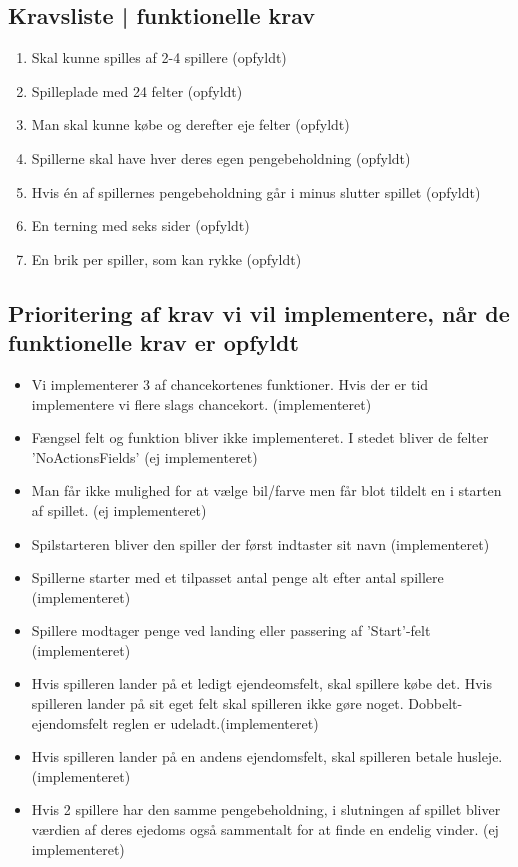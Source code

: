 \documentclass{article}
\begin{document}
\subsection{Kravsliste | funktionelle krav}
\begin{enumerate}
    \item Skal kunne spilles af 2-4 spillere (opfyldt)
    \item Spilleplade med 24 felter (opfyldt)
    \item Man skal kunne købe og derefter eje felter (opfyldt)
    \item Spillerne skal have hver deres egen pengebeholdning (opfyldt)
    \item Hvis én af spillernes pengebeholdning går i minus slutter spillet (opfyldt)
    \item En terning med seks sider (opfyldt)
    \item En brik per spiller, som kan rykke (opfyldt)
\end{enumerate}
\subsection{Prioritering af krav vi vil implementere, når de funktionelle krav er opfyldt}
\begin {itemize}
\item Vi implementerer 3 af chancekortenes funktioner. Hvis der er tid implementere vi flere slags chancekort. (implementeret)
\item Fængsel felt og funktion bliver ikke implementeret. I stedet bliver de felter 'NoActionsFields' (ej implementeret)
\item Man får ikke mulighed for at vælge bil/farve men får blot tildelt en i starten af spillet. (ej implementeret)
\item  Spilstarteren bliver  den spiller der først indtaster sit navn (implementeret)
\item Spillerne starter med et tilpasset antal penge alt efter antal spillere (implementeret)
\item Spillere modtager penge ved landing eller passering af 'Start'-felt (implementeret)
\item Hvis spilleren lander på et ledigt ejendeomsfelt, skal spillere købe det. Hvis spilleren lander på sit eget felt skal spilleren ikke gøre noget. Dobbelt-ejendomsfelt reglen er udeladt.(implementeret)
\item Hvis spilleren lander på en andens ejendomsfelt, skal spilleren betale husleje. (implementeret)
\item Hvis 2 spillere har den samme pengebeholdning, i slutningen af spillet bliver værdien af deres ejedoms også sammentalt for at finde en endelig vinder. (ej implementeret)
\end {itemize}
\end{document}
